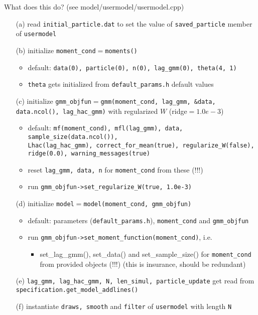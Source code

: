 \documentclass[11pt, letterpaper, notitlepage]{article}
\begin{document}
\begin{enumerate}
What does this do? (see model/usermodel/usermodel.cpp)
\begin{enumerate}
\item[(a)] read \texttt{initial\_particle.dat} to set the value of \texttt{saved\_particle} member of \texttt{usermodel}
\item[(b)] initialize \texttt{moment\_cond}$=$\texttt{moments()}
          \begin{itemize}
          \item default: \texttt{data(0), particle(0), n(0), lag\_gmm(0), theta(4, 1)}
          \item \texttt{theta} gets initialized from \texttt{default\_params.h} default values
		  \end{itemize}
\item[(c)] initialize \texttt{gmm\_objfun}$=$\texttt{gmm(moment\_cond, lag\_gmm, \&data, data.ncol(), lag\_hac\_gmm)} with regularized $W$ (ridge$=1.0e-3$)
          \begin{itemize}
          \item default: \texttt{mf(moment\_cond), mfl(lag\_gmm), data, sample\_size(data.ncol()), \\ Lhac(lag\_hac\_gmm), correct\_for\_mean(true), regularize\_W(false), ridge(0.0), warning\_messages(true)}          
          \item reset \texttt{lag\_gmm, data, n} for \texttt{moment\_cond} from these (!!!)
          \item run \texttt{gmm\_objfun->set\_regularize\_W(true, 1.0e-3)}
		  \end{itemize}
\item[(d)] initialize \texttt{model}$=$\texttt{model(moment\_cond, gmm\_objfun)}
          \begin{itemize}
          \item default: parameters (\texttt{default\_params.h}), \texttt{moment\_cond} and \texttt{gmm\_objfun}		          
          \item run \texttt{gmm\_objfun->set\_moment\_function(moment\_cond)}, i.e. 
          \begin{itemize}
          \item set\_lag\_gmm(), set\_data() and set\_sample\_size() for \texttt{moment\_cond} from provided objects (!!!) (this is insurance, should be redundant)
          \end{itemize}
              
          \end{itemize}
\item[(e)] \texttt{lag\_gmm, lag\_hac\_gmm, N, len\_simul, particle\_update} get read from\\ \texttt{specification.get\_model\_addlines()}
\item[(f)] instantiate \texttt{draws, smooth} and \texttt{filter} of \texttt{usermodel} with length \texttt{N}
\end{enumerate}


\end{enumerate}
\end{document}
